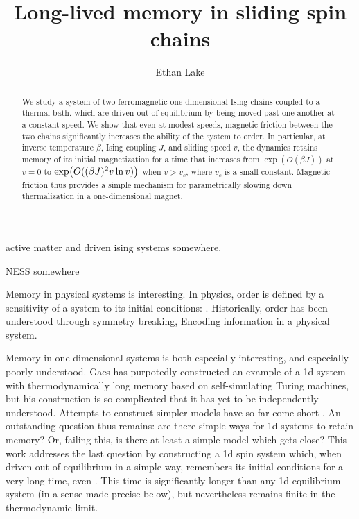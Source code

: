 \documentclass[prl,aps,twocolumn,groupedaddress,superscriptaddress,preprintnumbers,nobibnotes]{revtex4-2}
\begin{document}
	
	
	\title{Long-lived memory in sliding spin chains}
		\author{Ethan Lake}
	\begin{abstract}
		We study a system of two ferromagnetic one-dimensional Ising chains coupled to a thermal bath, which are driven out of equilibrium by being moved past one another at a constant speed. We show that even at modest speeds, magnetic friction between the two chains significantly increases the ability of the system to order. In particular, at inverse temperature $\beta$, Ising coupling $J$, and sliding speed $v$, the dynamics retains memory of its initial magnetization for a time that increases from $\exp(O(\beta J))$ at $v = 0$ to $\exp(O((\beta J)^2v\ln v))$ when $v>v_c$, where $v_c$ is a small constant. Magnetic friction thus provides a simple mechanism for parametrically slowing down thermalization in a one-dimensional magnet. 
	\end{abstract}
	
	\maketitle

	
	active matter and driven ising systems somewhere. 
	
	NESS somewhere 
	
	Memory in physical systems is interesting. In physics, order is defined by a sensitivity of a system to its initial conditions: . Historically, order has been understood through symmetry breaking, Encoding information in a physical system. 
	
	
	
	Memory in one-dimensional systems is both especially interesting, and especially poorly understood. Gacs has purpotedly constructed an example of a 1d system with thermodynamically long memory \cite{gacs2001reliable} based on self-simulating Turing machines, but his construction is so complicated that it has yet to be independently understood. Attempts to construct simpler models have so far come short \cite{gacs1978one,toom1995cellular,park1997ergodicity}. An outstanding question thus remains: are there simple ways for 1d systems to retain memory? Or, failing this, is there at least a simple model which gets close? 
	This work addresses the last question by constructing a 1d spin system which, when driven out of equilibrium in a simple way, remembers its initial conditions for a very long time, even . This time is significantly longer than any 1d equilibrium system (in a sense made precise below), but nevertheless remains finite in the thermodynamic limit.	
	
\end{document}

